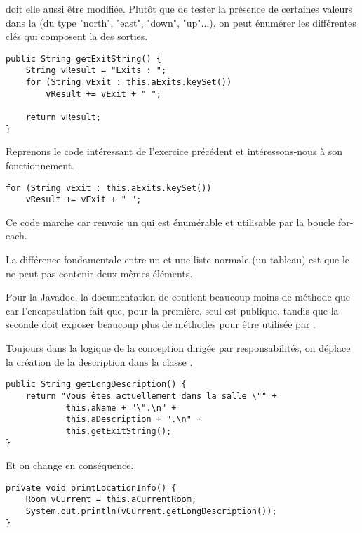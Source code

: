\begin{exercise}[subtitle=keySet]

 doit elle aussi être modifiée. Plutôt que de tester la présence de certaines valeurs dans la  (du type "north", "east", "down", "up"...), on peut énumérer les différentes clés qui composent la  des sorties.

\begin{verbatim}
public String getExitString() {
    String vResult = "Exits : ";
    for (String vExit : this.aExits.keySet())
        vResult += vExit + " ";

    return vResult;
}
\end{verbatim}
\end{exercise}

\begin{exercise}[subtitle=keySet et Javadoc]

Reprenons le code intéressant de l'exercice précédent et intéressons-nous à son fonctionnement.

\begin{verbatim}
for (String vExit : this.aExits.keySet())
    vResult += vExit + " ";
\end{verbatim}

Ce code marche car  renvoie un  qui est énumérable et utilisable par la boucle for-each.

La différence fondamentale entre un  et une liste normale (un tableau) est que le  ne peut pas contenir deux mêmes éléments.

Pour la Javadoc, la documentation de  contient beaucoup moins de méthode que  car l'encapsulation fait que, pour la première, seul  est publique, tandis que la seconde doit exposer beaucoup plus de méthodes  pour être utilisée par .

\end{exercise}

\begin{exercise}[subtitle=getLongDescription]

Toujours dans la logique de la conception dirigée par responsabilités, on déplace la création de la description dans la classe .

\begin{verbatim}
public String getLongDescription() {
    return "Vous êtes actuellement dans la salle \"" +
            this.aName + "\".\n" +
            this.aDescription + ".\n" +
            this.getExitString();
}
\end{verbatim}

Et on change  en conséquence.

\begin{verbatim}
private void printLocationInfo() {
    Room vCurrent = this.aCurrentRoom;
    System.out.println(vCurrent.getLongDescription());
}
\end{verbatim}
\end{exercise}

